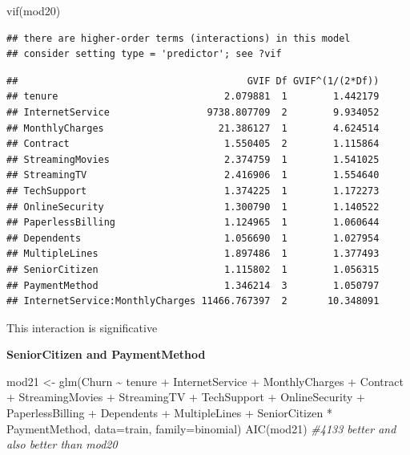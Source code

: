 \documentclass[
  twoside]{article}
\newenvironment{Shaded}{\begin{snugshade}}{\end{snugshade}}
\newcommand{\AttributeTok}[1]{\textcolor[rgb]{0.77,0.63,0.00}{#1}}
\newcommand{\CommentTok}[1]{\textcolor[rgb]{0.56,0.35,0.01}{\textit{#1}}}
\newcommand{\FunctionTok}[1]{\textcolor[rgb]{0.00,0.00,0.00}{#1}}
\newcommand{\NormalTok}[1]{#1}
\newcommand{\OtherTok}[1]{\textcolor[rgb]{0.56,0.35,0.01}{#1}}
\newcommand{\SpecialCharTok}[1]{\textcolor[rgb]{0.00,0.00,0.00}{#1}}
\begin{document}
\begin{Shaded}
\begin{Highlighting}[]
\FunctionTok{vif}\NormalTok{(mod20)}
\end{Highlighting}
\end{Shaded}

\begin{verbatim}
## there are higher-order terms (interactions) in this model
## consider setting type = 'predictor'; see ?vif
\end{verbatim}

\begin{verbatim}
##                                        GVIF Df GVIF^(1/(2*Df))
## tenure                             2.079881  1        1.442179
## InternetService                 9738.807709  2        9.934052
## MonthlyCharges                    21.386127  1        4.624514
## Contract                           1.550405  2        1.115864
## StreamingMovies                    2.374759  1        1.541025
## StreamingTV                        2.416906  1        1.554640
## TechSupport                        1.374225  1        1.172273
## OnlineSecurity                     1.300790  1        1.140522
## PaperlessBilling                   1.124965  1        1.060644
## Dependents                         1.056690  1        1.027954
## MultipleLines                      1.897486  1        1.377493
## SeniorCitizen                      1.115802  1        1.056315
## PaymentMethod                      1.346214  3        1.050797
## InternetService:MonthlyCharges 11466.767397  2       10.348091
\end{verbatim}

This interaction is significative

\textbf{SeniorCitizen and PaymentMethod}

\begin{Shaded}
\begin{Highlighting}[]
\NormalTok{mod21 }\OtherTok{\textless{}{-}} \FunctionTok{glm}\NormalTok{(Churn }\SpecialCharTok{\textasciitilde{}}\NormalTok{ tenure }\SpecialCharTok{+}\NormalTok{ InternetService }\SpecialCharTok{+}\NormalTok{ MonthlyCharges }\SpecialCharTok{+}\NormalTok{ Contract }\SpecialCharTok{+}\NormalTok{ StreamingMovies }\SpecialCharTok{+}\NormalTok{ StreamingTV }\SpecialCharTok{+}\NormalTok{ TechSupport }\SpecialCharTok{+}\NormalTok{ OnlineSecurity }\SpecialCharTok{+}\NormalTok{ PaperlessBilling }\SpecialCharTok{+}\NormalTok{ Dependents }\SpecialCharTok{+}\NormalTok{ MultipleLines }\SpecialCharTok{+}\NormalTok{ SeniorCitizen }\SpecialCharTok{*}\NormalTok{ PaymentMethod, }\AttributeTok{data=}\NormalTok{train, }\AttributeTok{family=}\NormalTok{binomial)}
\FunctionTok{AIC}\NormalTok{(mod21) }\CommentTok{\#4133 better and also better than mod20}
\end{Highlighting}
\end{Shaded}
\end{document}
